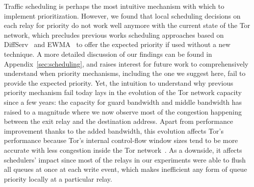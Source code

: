 Traffic scheduling is perhaps the most intuitive mechanism with which to
implement prioritization. However, we found that local scheduling decisions on
each relay for priority do not work well anymore with the current state of the
Tor network, which precludes previous works scheduling approaches based on
DiffServ~\cite{dovrolis1999case} and EWMA~\cite{tang2010improved} to offer the
expected priority if used without a new technique. A more detailed discussion of
our findings can be found in Appendix~\ref{sec:scheduling}, and raises interest
for future work to comprehensively understand when priority mechanisms,
including the one we suggest here, fail to provide the expected priority. Yet,
the intuition to understand why previous priority mechanism fail today lays in
the evolution of the Tor network capacity since a few years: the capacity for
guard bandwidth and middle bandwidth has raised to a magnitude where we now
observe most of the congestion happening between the exit relay and the
destination address. Apart from performance improvement thanks to the added
bandwidth, this evolution affects Tor's performance because Tor's internal
control-flow window sizes tend to be more accurate with less congestion inside
the Tor network~\cite{archive-2009-mail, kiraly2008solving}. As a downside, it
affects schedulers' impact since most of the relays in our experiments were able
to flush all queues at once at each write event, which makes inefficient any
form of queue priority locally at a particular relay.

